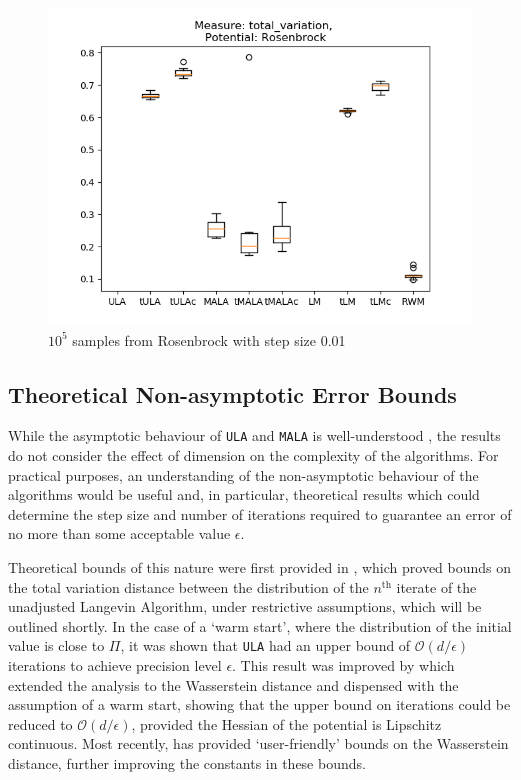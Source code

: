 \begin{figure}[ht!]
	\centering
		\includegraphics[height=0.43\textheight]{WriteUp/TV_rosenbrock_step0pt01.png}
	\caption{$10^5$ samples from Rosenbrock with step size 0.01}
	\label{fig:TVrosen01}
\end{figure}

\newpage
\subsection{Theoretical Non-asymptotic Error Bounds}

While the asymptotic behaviour of \texttt{ULA} and \texttt{MALA} is well-understood \cite{RT96}, the results do not consider the effect of dimension on the complexity of the algorithms.  For practical purposes, an understanding of the non-asymptotic behaviour of the algorithms would be useful and, in particular, theoretical results which could determine the step size and number of iterations required to guarantee an error of no more than some acceptable value $\epsilon$.

Theoretical bounds of this nature were first provided in \cite{dalalyan2017theoretical}, which proved bounds on the total variation distance between the distribution of the $n^{\text{th}}$ iterate of the unadjusted Langevin Algorithm, under restrictive assumptions, which will be outlined shortly.  In the case of a `warm start', where the distribution of the initial value is close to $\Pi$, it was shown that \texttt{ULA} had an upper bound of $\mathcal{O}(d/\epsilon)$ iterations to achieve precision level $\epsilon$.  This result was improved by \cite{durmus2016high, durmus2017nonasymptotic} which extended the analysis to the Wasserstein distance and dispensed with the assumption of a warm start, showing that the upper bound on iterations could be reduced to $\mathcal O (d/\epsilon)$, provided the Hessian of the potential is Lipschitz continuous.  Most recently, \cite{dalalyan2019user} has provided `user-friendly' bounds on the Wasserstein distance, further improving the constants in these bounds.

